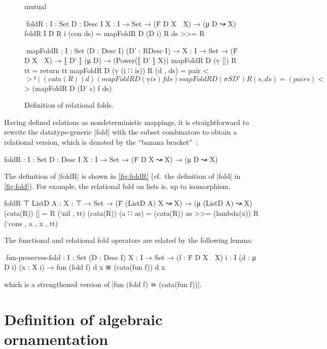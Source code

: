 \begin{figure}
\codefigure
\begin{code}
mutual

  ^^^foldR :  {I : Set} {D : Desc I} {X : I → Set} → (Ḟ D X ↝ X) → (μ D ↝ X)
  foldR {I} {D} R {i} (con ds) = mapFoldR D (D i) R ds >>= R

  ^^^mapFoldR :  {I : Set} (D : Desc I) (D' : RDesc I) →
                 {X : I → Set} → (Ḟ D X ↝ X) → ⟦ D' ⟧ (μ D) → (Power(⟦ D' ⟧ X))
  mapFoldR D (ṿ [])        R tt         = return tt
  mapFoldR D (ṿ (i ∷ is))  R (d  , ds)  = pair <$>²  ((cata(R)) d)
                                                     (mapFoldR D (ṿ is) f ds)
  mapFoldR D (σ S D')      R (s  , ds)  = (pair s) <$> (mapFoldR D (D' s) f ds)
\end{code}
\caption{Definition of relational folds.}
\label{fig:foldR}
\end{figure}

Having defined relations as nondeterministic mappings, it is straightforward to rewrite the datatype-generic |fold| with the subset combinators to obtain a relational version, which is denoted by the ``banana bracket''~\citep{Meijer-bananas}:
\begin{code}
foldR :  {I : Set} {D : Desc I} {X : I → Set} → (Ḟ D X ↝ X) → (μ D ↝ X)
\end{code}
The definition of |foldR| is shown in \autoref{fig:foldR} (cf.~the definition of |fold| in \autoref{fig:fold}).
For example, the relational fold on lists is, up to isomorphism,
\begin{code}
foldR {⊤} {ListD A} :  {X : ⊤ → Set} →
                       (Ḟ (ListD A) X ↝ X) → (μ (ListD A) ↝ X)
(cata(R)) []        =   R (`nil , tt)
(cata(R)) (a ∷ as)  =   (cata(R)) as >>= (lambda(x)) R (`cons , a , x , tt)
\end{code}
The functional and relational fold operators are related by the following lemma:
\begin{code}
^^^fun-preserves-fold :  {I : Set} (D : Desc I) {X : I → Set} →
                         (f : Ḟ D X ⇉ X) {i : I} (d : μ D i) (x : X i) →
                         fun (fold f) d x ≅ (cata(fun f)) d x
\end{code}
which is a strengthened version of |fun (fold f) ≃ (cata(fun f))|.

\section{Definition of algebraic ornamentation}
\label{sec:algOD}

